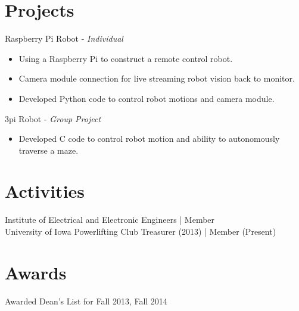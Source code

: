 \documentclass[letter]{res}
\begin{document}
\begin{resume}
\section{Projects}
Raspberry Pi Robot \newline - {\sl Individual} \\
\begin{itemize}
  \vspace{-2mm}
 \item Using a Raspberry Pi to construct a remote control robot.
 \item Camera module connection for live streaming robot vision back to monitor.
 \item Developed Python code to control robot motions and camera module.
\end{itemize}
3pi Robot \newline - {\sl Group Project}\\
\begin{itemize}
  \vspace{-2mm}
 \item Developed C code to control robot motion and ability to autonomously traverse a maze. 
 \end{itemize}

\section{Activities} 
 Institute of Electrical and Electronic Engineers | Member \\
 University of Iowa Powerlifting Club Treasurer (2013) | Member (Present) 
 
\section{Awards} 
 Awarded Dean’s List for Fall 2013, Fall 2014

\end{resume}
\end{document}
